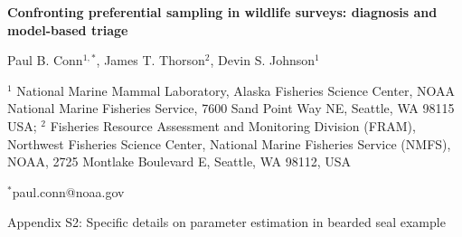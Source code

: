 \documentclass[times,mee,doublespace,]{besauth2}
\begin{document}
\begin{center} \bf {\large Confronting preferential sampling in wildlife surveys: diagnosis and model-based triage}

\vspace{0.7cm}
Paul B. Conn$^{1,*}$, James T. Thorson$^2$, Devin S. Johnson$^1$
\end{center}
\vspace{0.5cm}

\rm
\small


$^1$ National Marine Mammal Laboratory, Alaska Fisheries Science Center, NOAA National Marine Fisheries Service, 7600 Sand Point Way NE, Seattle, WA 98115 USA; $^2$ Fisheries Resource Assessment and Monitoring Division (FRAM), Northwest Fisheries Science Center, National Marine Fisheries Service (NMFS),
NOAA, 2725 Montlake Boulevard E, Seattle, WA 98112, USA

$^*$paul.conn@noaa.gov

\large
\bigskip
\centerline{Appendix S2: Specific details on parameter estimation in bearded seal example}
\bigskip
\small

\linenumbers

\def\VAR{{\rm Var}\,}
\def\COV{{\rm Cov}\,}
\def\Prob{{\rm P}\,}
\end{document}
